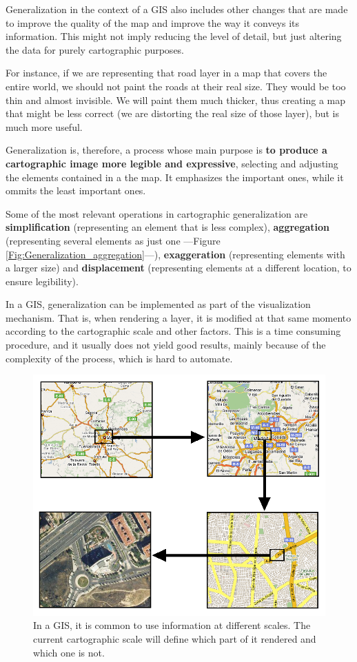 Generalization in the context of a GIS also includes other changes that are made to improve the quality of the map and improve the way it conveys its information. This might not imply reducing the level of detail, but just altering the data for purely cartographic purposes.

For instance, if we are representing that road layer in a map that covers the entire world, we should not paint the roads at their real size. They would be too thin and almost invisible. We will paint them much thicker, thus creating a map that might be less correct (we are distorting the real size of those layer), but is much more useful.

Generalization is, therefore, a process whose main purpose is \textbf{to produce a cartographic image more legible and expressive}, selecting and adjusting the elements contained in a the map. It emphasizes the important ones, while it ommits the least important ones.

Some of the most relevant operations in cartographic generalization are \textbf{simplification} (representing an element that is less complex), \textbf{aggregation} (representing several elements as just one ---Figure \ref{Fig:Generalization_aggregation}---), \textbf{exaggeration} (representing elements with a larger size) and \textbf{displacement} (representing elements at a different location, to ensure legibility).


In a GIS, generalization can be implemented as part of the visualization mechanism. That is, when rendering a layer, it is modified at that same momento according to the cartographic scale and other factors. This is a time consuming procedure, and it usually does not yield good results, mainly because of the complexity of the process, which is hard to automate.

\begin{figure}[!hbt]
\centering
\includegraphics[width=\textwidth]{Cartography/GIS_multi_scale.png}
\caption{\small In a GIS, it is common to use information at different scales. The current cartographic scale will define which part of it rendered and which one is not.}
\label{Fig:GIS_multi_scale} 
\end{figure}

